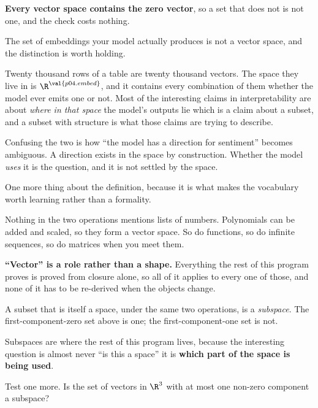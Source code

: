 \begin{fr}

\textbf{Every vector space contains the zero vector}, so a set that does not is
not one, and the check costs nothing.

\begin{aibox}
The set of embeddings your model actually produces is not a vector space, and
the distinction is worth holding.

Twenty thousand rows of a table are twenty thousand vectors. The space they
live in is $\R^{\val{p04.embed}}$, and it contains every combination of them
whether the model ever emits one or not. Most of the interesting claims in
interpretability are about \emph{where in that space} the model's outputs lie
\dash{} which is a claim about a subset, and a subset with structure is what
those claims are trying to describe.

Confusing the two is how \enquote{the model has a direction for sentiment}
becomes ambiguous. A direction exists in the space by construction. Whether the
model \emph{uses} it is the question, and it is not settled by the space.
\end{aibox}
\end{fr}

\begin{fr}
One more thing about the definition, because it is what makes the vocabulary
worth learning rather than a formality.

Nothing in the two operations mentions lists of numbers. Polynomials can be
added and scaled, so they form a vector space. So do functions, so do infinite
sequences, so do matrices when you meet them.

\textbf{\enquote{Vector} is a role rather than a shape.} Everything the rest of
this program proves is proved from closure alone, so all of it applies to every
one of those, and none of it has to be re-derived when the objects change.
\end{fr}

\begin{fr}
A subset that is itself a space, under the same two operations, is a
\emph{subspace}. The first-component-zero set above is one; the
first-component-one set is not.

Subspaces are where the rest of this program lives, because the interesting
question is almost never \enquote{is this a space} \dash{} it is
\textbf{which part of the space is being used}.

Test one more. Is the set of vectors in $\R^{3}$ with at most one non-zero
component a subspace?
\nextframe
\end{fr}

